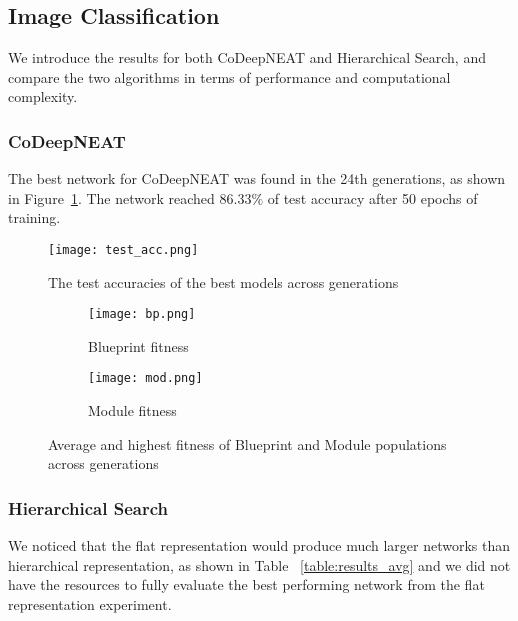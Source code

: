 \documentclass[11pt]{article}
\begin{document}
\subsection{Image Classification}
We introduce the results for both CoDeepNEAT and Hierarchical Search, and compare the two algorithms in terms of performance and computational complexity.

\subsubsection{CoDeepNEAT}
The best network for CoDeepNEAT was found in the 24th generations, as shown in Figure~\ref{fig:fitness}. The network reached 86.33$\%$ of test accuracy after 50 epochs of training.\\ 

\begin{figure}[h]
\begin{center}
\texttt{[image: test\_acc.png]}
\end{center}
\caption{The test accuracies of the best models across generations}
\label{fig:fitness}
\end{figure}

\begin{figure}[h]
\begin{subfigure}{0.5\textwidth}
\texttt{[image: bp.png]} 
\caption{Blueprint fitness}
\label{fig:bp}
\end{subfigure}
\begin{subfigure}{0.5\textwidth}
\texttt{[image: mod.png]}
\caption{Module fitness}
\label{fig:mod}
\end{subfigure}
\caption{Average and highest fitness of Blueprint and Module populations across generations}
\label{fig:bpmod}
\end{figure}

\subsubsection{Hierarchical Search}

We noticed that the flat representation would produce much larger networks than hierarchical representation, as shown in Table ~\ref{table:results_avg} and we did not have the resources to fully evaluate the best performing network from the flat representation experiment.
\end{document}
